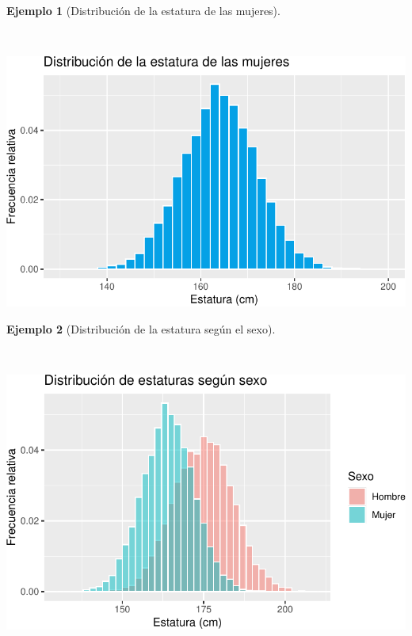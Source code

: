 \documentclass[
  a4paper,
]{scrreport}
\theoremstyle{plain}
\theoremstyle{definition}
\newtheorem{example}{Ejemplo}[chapter]
\theoremstyle{definition}
\theoremstyle{remark}
\begin{document}
\begin{example}[Distribución de la estatura de las
mujeres]\protect\hypertarget{exm-distribucion-estatura-mujeres}{}\label{exm-distribucion-estatura-mujeres}

~

\includegraphics{02-estadistica-descriptiva_files/figure-pdf/histograma-estatura-mujeres-1.pdf}

\end{example}

\begin{example}[Distribución de la estatura según el
sexo]\protect\hypertarget{exm-distribucion-estaturas-sexo}{}\label{exm-distribucion-estaturas-sexo}

~

\includegraphics{02-estadistica-descriptiva_files/figure-pdf/histograma-estatura-sexo-1.pdf}

\end{example}
\end{document}
